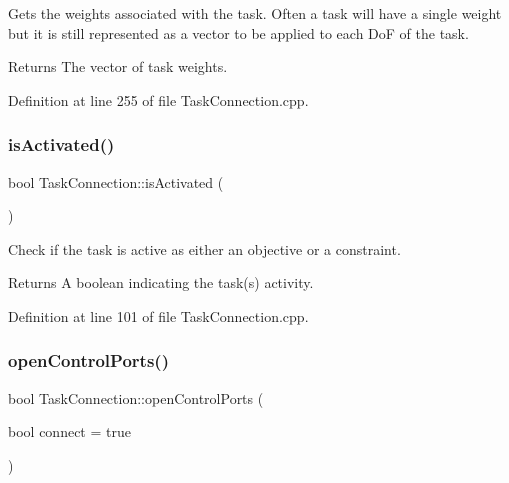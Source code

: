 Gets the weights associated with the task. Often a task will have a single weight but it is still represented as a vector to be applied to each DoF of the task.

\begin{DoxyReturn}{Returns}
The vector of task weights. 
\end{DoxyReturn}


Definition at line 255 of file Task\+Connection.\+cpp.

\hypertarget{classocra__recipes_1_1TaskConnection_a07179a0e687fd28d091eeebb1157fac0}{}\label{classocra__recipes_1_1TaskConnection_a07179a0e687fd28d091eeebb1157fac0} 
\subsubsection{\texorpdfstring{is\+Activated()}{isActivated()}}
{\footnotesize\ttfamily bool Task\+Connection\+::is\+Activated (\begin{DoxyParamCaption}{ }\end{DoxyParamCaption})}

Check if the task is active as either an objective or a constraint.

\begin{DoxyReturn}{Returns}
A boolean indicating the task(s) activity. 
\end{DoxyReturn}


Definition at line 101 of file Task\+Connection.\+cpp.

\hypertarget{classocra__recipes_1_1TaskConnection_af80b37e5862169c841e4fec70a354937}{}\label{classocra__recipes_1_1TaskConnection_af80b37e5862169c841e4fec70a354937} 
\subsubsection{\texorpdfstring{open\+Control\+Ports()}{openControlPorts()}}
{\footnotesize\ttfamily bool Task\+Connection\+::open\+Control\+Ports (\begin{DoxyParamCaption}\item[{bool}]{connect = {\ttfamily true} }\end{DoxyParamCaption})}

